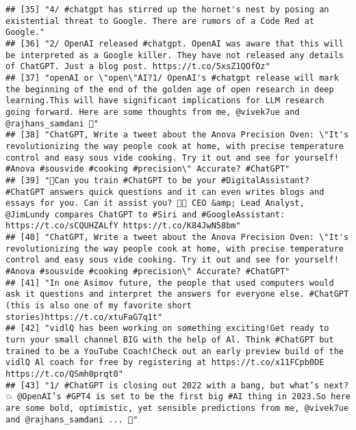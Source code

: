 \documentclass[
]{article}
\begin{document}
\begin{verbatim}
## [35] "4/ #chatgpt has stirred up the hornet's nest by posing an existential threat to Google. There are rumors of a Code Red at Google."                                                                                                                                                                             
## [36] "2/ OpenAI released #chatgpt. OpenAI was aware that this will be interpreted as a Google killer. They have not released any details of ChatGPT. Just a blog post. https://t.co/5xsZ1QOfOz"                                                                                                                      
## [37] "openAI or \"open\"AI?1/ OpenAI's #chatgpt release will mark the beginning of the end of the golden age of open research in deep learning.This will have significant implications for LLM research going forward. Here are some thoughts from me, @vivek7ue and @rajhans_samdani 🧵"                            
## [38] "ChatGPT, Write a tweet about the Anova Precision Oven: \"It's revolutionizing the way people cook at home, with precise temperature control and easy sous vide cooking. Try it out and see for yourself! #Anova #sousvide #cooking #precision\" Accurate? #ChatGPT"                                            
## [39] "📱Can you train #ChatGPT to be your #DigitalAssistant? #ChatGPT answers quick questions and it can even writes blogs and essays for you. Can it assist you? 👩‍💻 CEO &amp; Lead Analyst, @JimLundy compares ChatGPT to #Siri and #GoogleAssistant: https://t.co/sCQUHZALfY https://t.co/K84JwN58bm"            
## [40] "ChatGPT, Write a tweet about the Anova Precision Oven: \"It's revolutionizing the way people cook at home, with precise temperature control and easy sous vide cooking. Try it out and see for yourself! #Anova #sousvide #cooking #precision\" Accurate? #ChatGPT"                                            
## [41] "In one Asimov future, the people that used computers would ask it questions and interpret the answers for everyone else. #ChatGPT (this is also one of my favorite short stories)https://t.co/xtuFaG7q1t"                                                                                                      
## [42] "vidlQ has been working on something exciting!Get ready to turn your small channel BIG with the help of Al. Think #ChatGPT but trained to be a YouTube Coach!Check out an early preview build of the vidlQ Al coach for free by registering at https://t.co/x11FCpb0DE https://t.co/QSmh0prqt0"                 
## [43] "1/ #ChatGPT is closing out 2022 with a bang, but what’s next? 💥 @OpenAI’s #GPT4 is set to be the first big #AI thing in 2023.So here are some bold, optimistic, yet sensible predictions from me, @vivek7ue and @rajhans_samdani ... 👀"                                                                      

\end{verbatim}
\end{document}
